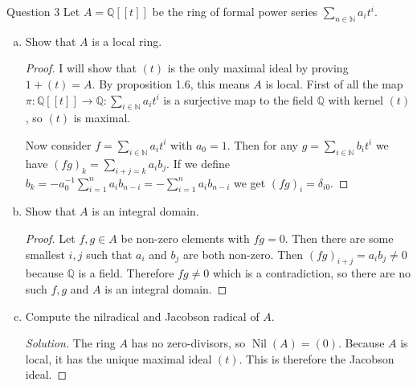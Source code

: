 \documentclass{article}
\newcommand{\N}{\mathbb{N}}
\newcommand{\Q}{\mathbb{Q}}
\DeclareMathOperator{\Nil}{Nil}
\newenvironment{question}[1][]{\begin{paragraph}{Question #1}}{\end{paragraph}}
\newenvironment{solution}{\begin{proof}[Solution]\renewcommand\qedsymbol{}}{\end{proof}}
\theoremstyle{definition}
\begin{document}
\begin{question}[3]
    Let \(A=\Q[[t]]\) be the ring of formal power series
    \(\sum_{n\in\N}a_{i}t^{i}\).
    \begin{enumerate}[a)]
        \item Show that \(A\) is a local ring.

              \begin{proof}
                  I will show that \((t)\) is the only maximal ideal by proving
                  \(1+(t)=A\). By proposition 1.6, this means \(A\) is local.
                  First of all the map
                  \(\pi:\Q[[t]]\to\Q:\sum_{i\in\N}a_{i}t^{i}\) is a surjective
                  map to the field \(\Q\) with kernel \((t)\), so \((t)\) is
                  maximal.

                  Now consider \(f=\sum_{i\in\N}a_{i}t^{i}\) with \(a_{0}=1\).
                  Then for any \(g=\sum_{i\in\N}b_{i}t^{i}\) we have
                  \((fg)_{k}=\sum_{i+j=k}a_{i}b_{j}\). If we define
                  \(b_{k}=-a_{0}^{-1}\sum_{i=1}^{n}a_{i}b_{n-i}=-\sum_{i=1}^{n}a_{i}b_{n-i}\)
                  we get \((fg)_{i}=\delta_{i0}\).
              \end{proof}

        \item Show that \(A\) is an integral domain.

              \begin{proof}
                  Let \(f,g\in A\) be non-zero elements with \(fg=0\). Then
                  there are some smallest \(i,j\) such that \(a_{i}\) and
                  \(b_{j}\) are both non-zero. Then
                  \((fg)_{i+j}=a_{i}b_{j}\neq0\) because \(\Q\) is a field.
                  Therefore \(fg\neq0\) which is a contradiction, so there are
                  no such \(f,g\) and \(A\) is an integral domain.
              \end{proof}

        \item Compute the nilradical and Jacobson radical of \(A\).

              \begin{solution}
                  The ring \(A\) has no zero-divisors, so \(\Nil(A)=(0)\).
                  Because \(A\) is local, it has the unique maximal ideal
                  \((t)\). This is therefore the Jacobson ideal.
              \end{solution}
    \end{enumerate}
\end{question}
\end{document}
